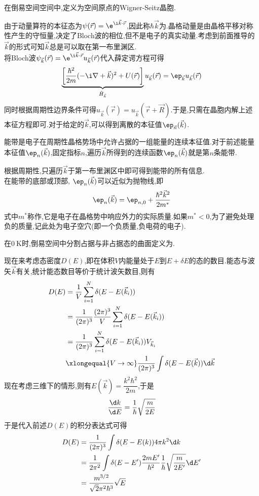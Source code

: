 \documentclass{ctexbook}
\begin{document}
\begin{definition}[布里渊区]
    在倒易空间空间中,定义为空间原点的Wigner-Seitz晶胞.
\end{definition}
由于动量算符的本征态为$\psi(\vec{r})=\e^{\i\vec{k}\cdot\vec{r}}$,因此称$\hbar\vec{k}$为.晶格动量是由晶格平移对称性产生的守恒量,决定了Bloch波的相位,但不是电子的真实动量.考虑到前面推导的$\vec{k}$的形式可知$\vec{k}$总是可以取在第一布里渊区.\\
\indent 将Bloch波$\psi_{\vec{k}}(\vec{r})=\e^{\i\vec{k}\cdot\vec{r}}u_{\vec{k}}(\vec{r})$代入薛定谔方程可得
\[\underbrace{\left[\dfrac{\hbar^2}{2m}(-\i\nabla+\vec{k})^2+U(\vec{r})\right]}_{\hat{H}_{\vec{k}}}u_{\vec{k}}(\vec{r})=\ep_{\vec{k}}u_{\vec{k}}(\vec{r})\]
同时根据周期性边界条件可得$u_{\vec{k}}(\vec{r})=u_{\vec{k}}(\vec{r}+\vec{R})$.于是,只需在晶胞内解上述本征方程即可.对于给定的$\vec{k}$,可以得到离散的本征值$\ep_{\vec{n}}(\vec{k})$.
\begin{definition}[能带]
    能带是电子在周期性晶格势场中允许占据的一组能量的连续本征值.对于前述能量本征值$\ep_{n}(\vec{k})$,固定指标$n$,遍历$\vec{k}$所得到的连续函数$\ep_{n}(\vec{k})$就是第$n$条能带.
\end{definition}
根据周期性,只遍历$\vec{k}$于第一布里渊区中即可得到能带的所有信息.\\
\indent 在能带的底部或顶部, $\ep_{n}(\vec{k})$可以近似为抛物线,即
\[\ep_{n}(\vec{k})=\ep_{n,0}+\dfrac{\hbar^2\vec{k}^2}{2m^\ast}\]
式中$m^\ast$称作,它是电子在晶格势中响应外力的实际质量.如果$m^\ast<0$,为了避免处理负的质量,记此处为电子空穴(即一个负质量,负电荷的电子).
\begin{definition}[费米面]
    在$\SI{0}{\kelvin}$时,倒易空间中分割占据与非占据态的曲面定义为.
\end{definition}
现在来考虑态密度$D(E)$,即在体积$V$内能量处于$E$到$E+\delta E$的态的数目.能态与波矢$\vec{k}$有关,统计能态数目等价于统计波矢数目,则有
\[\begin{aligned}
    D(E)
    &=\dfrac{1}{V}\sum_{i=1}^{N}\delta(E-E(\vec{k}_i))\\
    &=\dfrac{1}{(2\pi)^3}\dfrac{(2\pi)^3}{V}\sum_{i=1}^{N}\delta(E-E(\vec{k}_i))\\
    &=\dfrac{1}{(2\pi)^3}\sum_{i=1}^{N}\delta(E-E(\vec{k}_i))V_{\vec{k}_i}\\
    &\xlongequal{V\to\infty}\dfrac{1}{(2\pi)^3}\int\delta(E-E(\vec{k}))\d\vec{k}
\end{aligned}\]
现在考虑三维下的情形,则有$E(\vec{k})=\dfrac{k^2\hbar^2}{2m}$,于是
\[\dfrac{\d k}{\d E}=\dfrac{1}{\hbar}\sqrt{\dfrac{m}{2E}}\]
于是代入前述$D(E)$的积分表达式可得
\[\begin{aligned}
    D(E)
    &=\dfrac{1}{(2\pi)^3}\int\delta(E-E(k))4\pi k^2\d k\\
    &=\dfrac{1}{2\pi^2}\int\delta(E-E')\dfrac{2mE'}{\hbar^2}\dfrac{1}{\hbar}\sqrt{\dfrac{m}{2E'}}\d E'\\
    &=\dfrac{m^{3/2}}{\sqrt{2}\pi^2\hbar^3}\sqrt{E}
\end{aligned}\]
\end{document}

